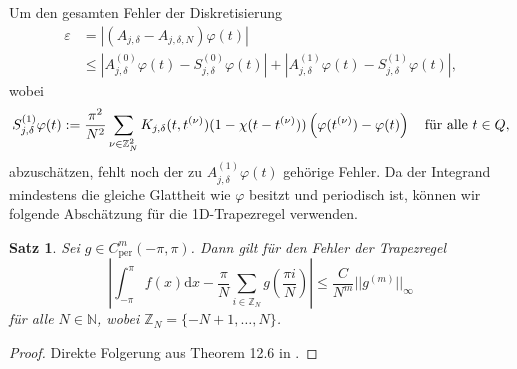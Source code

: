 \documentclass[12pt,a4paper]{scrartcl}
\newtheorem{Satz}{Satz}[section]
\newcommand{\dd}{\mathrm{d}}
\numberwithin{equation}{section}
\newcommand{\Z}{\mathbb{Z}} %
\newcommand{\N}{\mathbb{N}} %
\newcommand{\per}{\operatorname{per}}
\newcommand{\fa}{\text{\quad für alle }}
\begin{document}
Um den gesamten Fehler der Diskretisierung
\begin{align*}
\varepsilon &= |(A_{j,\delta}-A_{j,\delta,N})\varphi(t)| \\
& \leq |A^{(0)}_{j,\delta}\varphi(t) - S^{(0)}_{j,\delta}\varphi(t)| +|A^{(1)}_{j,\delta}\varphi(t) - S^{(1)}_{j,\delta}\varphi(t)|,
\end{align*}
wobei
\[
S^{(1)}_{j,\delta}\varphi(t) := \frac{\pi^2}{N^2}\sum_{\nu\in\Z_N^2}  K_{j,\delta}(t,t^{(\nu)})(1-\chi(t-t^{(\nu)})) \left(\varphi(t^{(\nu)})- \varphi(t)\right) \fa t \in Q,
\]
abzuschätzen, fehlt noch der zu $A^{(1)}_{j,\delta}\varphi(t)$ gehörige Fehler. Da der Integrand mindestens die gleiche Glattheit wie $\varphi$ besitzt und periodisch ist, können wir folgende Abschätzung für die 1D-Trapezregel verwenden.
\begin{Satz} \label{Trapez2}
Sei $g \in C_{\per}^m(-\pi,\pi)$. Dann gilt für den Fehler der Trapezregel
\[
\left| \int_{-\pi}^{\pi}f(x) \dd x - \frac{\pi}{N} \sum_{i \in \Z_N} g\left(\frac{\pi i }{N}\right)\right| \leq \frac{C}{N^m}||g^{(m)}||_\infty
\]
für alle $N \in \N$, wobei $\Z_N= \{-N+1, \dots, N \}$.
\end{Satz}
\begin{proof}
Direkte Folgerung aus Theorem 12.6 in \cite{kress}.
\end{proof}
\end{document}

